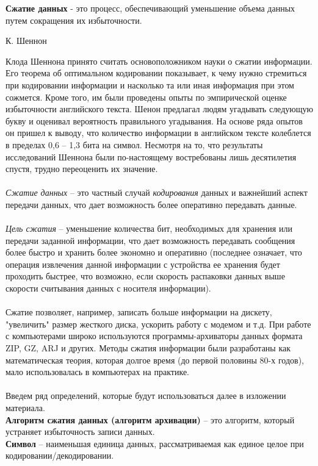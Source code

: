 \textbf{Сжатие данных} - это процесс, обеспечивающий уменьшение объема данных путем сокращения их избыточности.
\begin{flushright}
  К. Шеннон
\end{flushright}
Клода Шеннона принято считать основоположником науки о сжатии информации. Его теорема об оптимальном кодировании показывает, к чему нужно стремиться при кодировании информации и насколько та или иная информация при этом сожмется. Кроме того, им были проведены опыты по эмпирической оценке избыточности английского текста. Шенон предлагал людям угадывать следующую букву и оценивал вероятность правильного угадывания. На основе ряда опытов он пришел к выводу, что количество информации в английском тексте колеблется в пределах 0,6 – 1,3 бита на символ. Несмотря на то, что результаты исследований Шеннона были по-настоящему востребованы лишь десятилетия спустя, трудно переоценить их значение.\\
\\\emph{Сжатие данных} -- это частный случай \emph{кодирования} данных и важнейший аспект передачи данных, что дает возможность более оперативно передавать данные. 
\\\\\emph{Цель сжатия} -- уменьшение количества бит, необходимых для хранения или передачи заданной информации, что дает возможность передавать сообщения более быстро и хранить более экономно и оперативно (последнее означает, что операция извлечения данной информации с устройства ее хранения будет проходить быстрее, что возможно, если скорость распаковки данных выше скорости считывания данных с носителя информации).\\
\\Сжатие позволяет, например, записать больше информации на дискету, "увеличить" размер жесткого диска, ускорить работу с модемом и т.д. При работе с компьютерами широко используются программы-архиваторы данных формата ZIP, GZ, ARJ и других. Методы сжатия информации были разработаны как математическая теория, которая долгое время (до первой половины 80-х годов), мало использовалась в компьютерах на практике.\\
\\Введем ряд определений, которые будут использоваться далее в изложении материала.
\\\textbf{Алгоритм сжатия данных (алгоритм архивации)} -- это алгоритм, который устраняет избыточность записи данных.
\\\textbf{Символ} -- наименьшая единица данных, рассматриваемая как единое целое при кодировании/декодировании.
